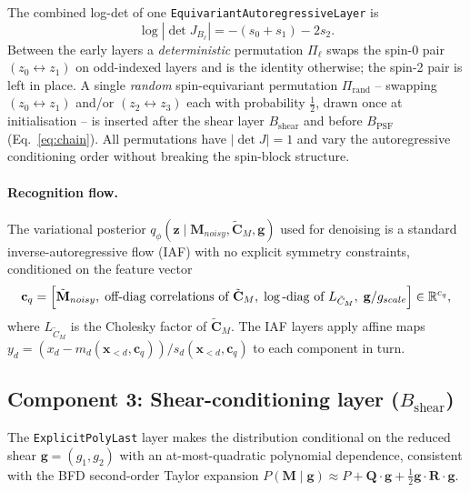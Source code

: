 The combined log-det of one \texttt{EquivariantAutoregressiveLayer} is
\begin{equation}
  \log|\det J_{B_\ell}| = -(s_0+s_1) - 2 s_2.
\end{equation}
Between the early layers a \emph{deterministic} permutation $\Pi_\ell$ swaps
the spin-0 pair $(z_0\leftrightarrow z_1)$ on odd-indexed layers and is the
identity otherwise; the spin-2 pair is left in place.  A single \emph{random}
spin-equivariant permutation $\Pi_{\mathrm{rand}}$ -- swapping
$(z_0\leftrightarrow z_1)$ and/or $(z_2\leftrightarrow z_3)$ each with
probability $\tfrac{1}{2}$, drawn once at initialisation -- is inserted after
the shear layer $B_{\mathrm{shear}}$ and before $B_{\mathrm{PSF}}$
(Eq.~\eqref{eq:chain}).  All permutations have $|\det J|=1$ and vary the
autoregressive conditioning order without breaking the spin-block structure.

\paragraph{Recognition flow.}
The variational posterior $q_\phi(\mathbf{z}\mid\mathbf{M}_{noisy},\tilde{\mathbf{C}}_M,\mathbf{g})$
used for denoising is a standard inverse-autoregressive flow (IAF) with
no explicit symmetry constraints, conditioned on the feature vector
\begin{equation}
  \mathbf{c}_q
  = \Bigl[\tilde{\mathbf{M}}_{noisy},\;
          \text{off-diag correlations of }\tilde{\mathbf{C}}_M,\;
          \log\text{-diag of }L_{\tilde{C}_M},\;
          \mathbf{g}/g_{scale}\Bigr]
  \in\mathbb{R}^{c_q},
\end{equation}
where $L_{\tilde{C}_M}$ is the Cholesky factor of $\tilde{\mathbf{C}}_M$.
The IAF layers apply affine maps $y_d=(x_d-m_d(\mathbf{x}_{<d},\mathbf{c}_q))
/s_d(\mathbf{x}_{<d},\mathbf{c}_q)$ to each component in turn.

\subsection*{Component 3: Shear-conditioning layer ($B_{\mathrm{shear}}$)}

The \texttt{ExplicitPolyLast} layer makes the distribution conditional on the
reduced shear $\mathbf{g}=(g_1,g_2)$ with an at-most-quadratic polynomial
dependence, consistent with the BFD second-order Taylor expansion
$P(\mathbf{M}\mid\mathbf{g})\approx P+\mathbf{Q}\cdot\mathbf{g}+\frac{1}{2}\mathbf{g}\cdot\mathbf{R}\cdot\mathbf{g}$.

